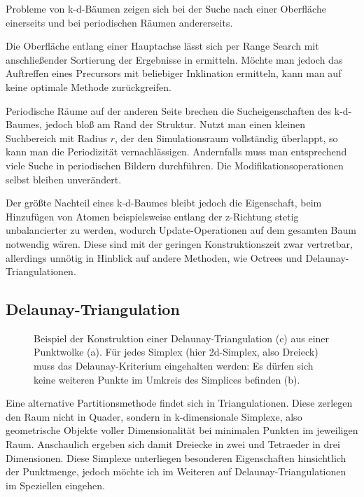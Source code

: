 Probleme von k-d-Bäumen zeigen sich bei der Suche nach einer Oberfläche einerseits und bei periodischen Räumen andererseits.

Die Oberfläche entlang einer Hauptachse lässt sich per Range Search mit anschließender Sortierung der Ergebnisse in  ermitteln.
Möchte man jedoch das Auftreffen eines Precursors mit beliebiger Inklination ermitteln, kann man auf keine optimale Methode zurückgreifen.

Periodische Räume auf der anderen Seite brechen die Sucheigenschaften des k-d-Baumes, jedoch bloß am Rand der Struktur.
Nutzt man einen kleinen Suchbereich mit Radius $r$, der den Simulationsraum vollständig überlappt, so kann man die Periodizität vernachlässigen.
Andernfalls muss man entsprechend viele Suche in periodischen Bildern durchführen.
Die Modifikationsoperationen selbst bleiben unverändert.

Der größte Nachteil eines k-d-Baumes bleibt jedoch die Eigenschaft, beim Hinzufügen von Atomen beispielsweise entlang der z-Richtung stetig unbalancierter zu werden, wodurch Up\-date-Opera\-tionen auf dem gesamten Baum notwendig wären.
Diese sind mit der geringen Konstruktionszeit zwar vertretbar, allerdings unnötig in Hinblick auf andere Methoden, wie Octrees und Delaunay-Triangulationen.

\subsection{Delaunay-Triangulation}\label{datadelaunay}

\begin{figure}[bhpt]
  \centering
  \def\svgwidth{\textwidth}
  
  \caption[Delaunay-Triangulation]{Beispiel der Konstruktion einer Delaunay-Triangulation (c) aus einer Punktwolke (a).
    Für jedes Simplex (hier 2d-Simplex, also Dreieck) muss das Delaunay-Kriterium eingehalten werden:
    Es dürfen sich keine weiteren Punkte im Umkreis des Simplices befinden (b).
  }
  \label{fig:delaunay}
\end{figure}

Eine alternative Partitionsmethode findet sich in Triangulationen.
Diese zerlegen den Raum nicht in Quader, sondern in k-dimensionale Simplexe, also geometrische Objekte voller Dimensionalität bei minimalen Punkten im jeweiligen Raum.
Anschaulich ergeben sich damit Dreiecke in zwei und Tetraeder in drei Dimensionen.
Diese Simplexe unterliegen besonderen Eigenschaften hinsichtlich der Punktmenge, jedoch möchte ich im Weiteren auf Delaunay-Triangulationen im Speziellen eingehen.

